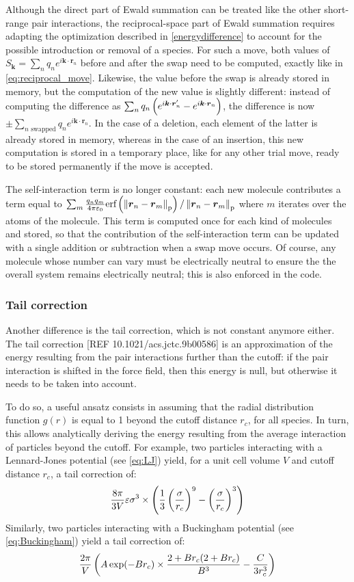 \documentclass[main.tex]{subfiles}
\begin{document}
Although the direct part of Ewald summation can be treated like the other short-range pair interactions, the reciprocal-space part of Ewald summation requires adapting the optimization described in \cref{energydifference} to account for the possible introduction or removal of a species. For such a move, both values of $S_{\boldsymbol k} = \sum_n q_ne^{i\boldsymbol k\cdot\boldsymbol r_n}$ before and after the swap need to be computed, exactly like in \cref{eq:reciprocal_move}. Likewise, the value before the swap is already stored in memory, but the computation of the new value is slightly different: instead of computing the difference as $\sum_n q_n\left(e^{i\boldsymbol k\cdot\boldsymbol r'_n} - e^{i\boldsymbol k\cdot\boldsymbol r_n}\right)$, the difference is now $\pm\sum_{n\text{ swapped}} q_n e^{i\boldsymbol k\cdot\boldsymbol r_n}$. In the case of a deletion, each element of the latter is already stored in memory, whereas in the case of an insertion, this new computation is stored in a temporary place, like for any other trial move, ready to be stored permanently if the move is accepted.

The self-interaction term is no longer constant: each new molecule contributes a term equal to $\sum_m\frac{q_n q_m}{4\pi\varepsilon_0}\text{erf}\left(\left\|\boldsymbol r_n - \boldsymbol r_m\right\|_\text{p}\right)/\left\|\boldsymbol r_n - \boldsymbol r_m\right\|_\text{p}$ where $m$ iterates over the atoms of the molecule. This term is computed once for each kind of molecules and stored, so that the contribution of the self-interaction term can be updated with a single addition or subtraction when a swap move occurs. Of course, any molecule whose number can vary must be electrically neutral to ensure the the overall system remains electrically neutral; this is also enforced in the code.

\subsubsection{Tail correction}

\label{tailcorrection}

Another difference is the tail correction, which is not constant anymore either. The tail correction [REF 10.1021/acs.jctc.9b00586] is an approximation of the energy resulting from the pair interactions further than the cutoff: if the pair interaction is shifted in the force field, then this energy is null, but otherwise it needs to be taken into account.

To do so, a useful ansatz consists in assuming that the radial distribution function $g(r)$ is equal to 1 beyond the cutoff distance $r_c$, for all species. In turn, this allows analytically deriving the energy resulting from the average interaction of particles beyond the cutoff. For example, two particles interacting with a Lennard-Jones potential (see \cref{eq:LJ}) yield, for a unit cell volume $V$ and cutoff distance $r_c$, a tail correction of:
\[\frac{8\pi}{3V}\varepsilon\sigma^3\times\left(\frac13\left(\frac{\sigma}{r_c}\right)^9 - \left(\frac{\sigma}{r_c}\right)^3\right)\]
Similarly, two particles interacting with a Buckingham potential (see \cref{eq:Buckingham}) yield a tail correction of:
\[\frac{2\pi}V \left(A\exp(-Br_c)\times\frac{2 + Br_c(2 + Br_c)}{B^3} - \frac C{3r_c^3}\right)\]
\end{document}

